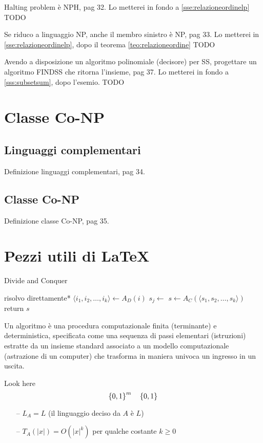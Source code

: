 Halting problem è NPH, pag 32.
Lo metterei in fondo a \ref{sse:relazioneordinelp}
TODO

Se riduco a linguaggio NP, anche il membro sinistro è NP, pag 33.
Lo metterei in \ref{sse:relazioneordinelp}, dopo il teorema \ref{teo:relazioneordine}
TODO

Avendo a disposizione un algoritmo polinomiale (decisore) per SS, progettare un algoritmo FINDSS che ritorna l'insieme, pag 37.
Lo metterei in fondo a \ref{sss:subsetsum}, dopo l'esemio.
TODO

\section{Classe Co-NP}

\subsection{Linguaggi complementari}
Definizione linguaggi complementari, pag 34.

\subsection{Classe Co-NP}
Definizione classe Co-NP, pag 35.


\section{Pezzi utili di \LaTeX{}}
\begin{algorithm}[H]
\caption{Divide and Conquer}\label{alg:dnc}
\begin{algorithmic}[1]
            \State *risolvo direttamente*
        \EndIf
        \State $\langle i_1, i_2, \dots, i_k \rangle \gets A_D(i)$ 
            \State $s_j \gets $ 
        \EndFor
        \State $s \gets A_C(\langle s_1, s_2, \dots, s_k \rangle)$
        \State return $s$
    \EndProcedure
\end{algorithmic}
\end{algorithm}


\begin{definition}[Algoritmo]\label{def:algex}
    Un algoritmo è una procedura computazionale finita (terminante) e deterministica, specificata come una sequenza di passi elementari (istruzioni) estratte da un insieme standard associato a un modello computazionale (astrazione di un computer) che trasforma in maniera univoca un ingresso in un uscita.
\end{definition}

Look here 
\begin{equation*}
    \left\{0,1\right\}^{m}
    \quad
    \left\{0,1\right\}^{}
\end{equation*}

\begin{itemize}[noitemsep,parsep=0pt,partopsep=0pt,topsep=0pt]
    \item[--] $L_A = L$ (il linguaggio deciso da $A$ è $L$)
    \item[--] $T_A(|x|) = O(|x|^k)$ per qualche costante $k \geq 0$
\end{itemize}
